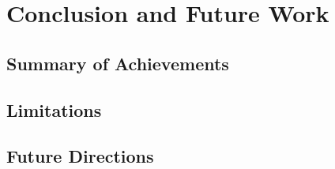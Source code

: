 \chapter{Conclusion and Future Work}
\label{ch:conclusion}


\section{Summary of Achievements}
\label{sec:summary_achievements}

\section{Limitations}
\label{sec:limitations}

\section{Future Directions}
\label{sec:future_work}

